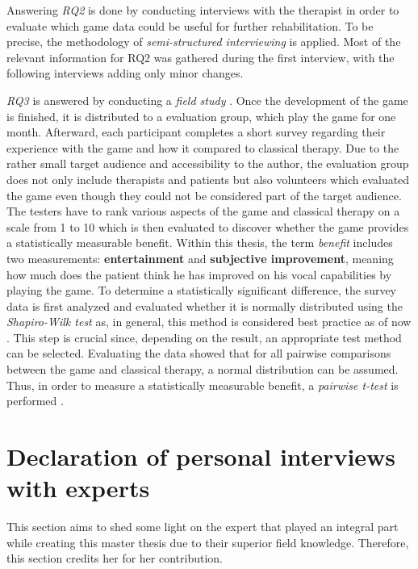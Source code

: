 \documentclass[draft,final]{vutinfth} %
\begin{document}
Answering \emph{RQ2} is done by conducting interviews with the therapist in order to evaluate which game data could be useful for further rehabilitation. To be precise, the methodology of \emph{semi-structured interviewing} \cite{wilde2006methodenspektrum} is applied. Most of the relevant information for RQ2 was gathered during the first interview, with the following interviews adding only minor changes.

\emph{RQ3} is answered by conducting a \emph{field study} \cite{wilde2006methodenspektrum}. Once the development of the game is finished, it is distributed to a evaluation group, which play the game for one month. Afterward, each participant completes a short survey regarding their experience with the game and how it compared to classical therapy. Due to the rather small target audience and accessibility to the author, the evaluation group does not only include therapists and patients but also volunteers which evaluated the game even though they could not be considered part of the target audience. The testers have to rank various aspects of the game and classical therapy on a scale from 1 to 10 which is then evaluated to discover whether the game provides a statistically measurable benefit. Within this thesis, the term \emph{benefit} includes two measurements: \textbf{entertainment} and \textbf{subjective improvement}, meaning how much does the patient think he has improved on his vocal capabilities by playing the game. To determine a statistically significant difference, the survey data is first analyzed and evaluated whether it is normally distributed using the \emph{Shapiro-Wilk test} \cite{shaphiro1965analysis} as, in general, this method is considered best practice as of now \cite{hernandez2021testing}. This step is crucial since, depending on the result, an appropriate test method can be selected. Evaluating the data showed that for all pairwise comparisons between the game and classical therapy, a normal distribution can be assumed. Thus, in order to measure a statistically measurable benefit, a \emph{pairwise t-test} is performed \cite{maxwell1980pairwise}.

\section{Declaration of personal interviews with experts}
This section aims to shed some light on the expert that played an integral part while creating this master thesis due to their superior field knowledge. Therefore, this section credits her for her contribution. \\
\end{document}
